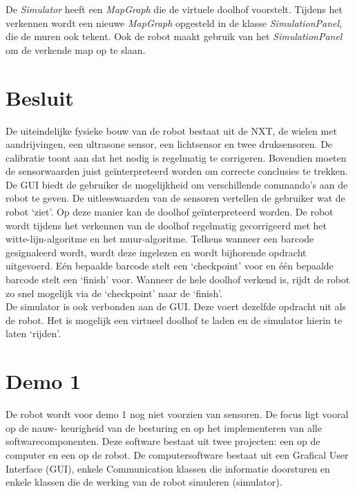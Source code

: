 \documentclass[eind]{penoverslag}
\begin{document}
De \textit{Simulator} heeft een \textit{MapGraph} die de virtuele doolhof voorstelt. Tijdens het verkennen wordt een nieuwe \textit{MapGraph} opgesteld in de klasse \textit{SimulationPanel}, die de muren ook tekent. Ook de robot maakt gebruik van het \textit{SimulationPanel} om de verkende map op te slaan.

\section{Besluit} %
\label{sec:besl}
De uiteindelijke fysieke bouw van de robot bestaat uit de NXT, de wielen met aandrijvingen, een ultrasone sensor, een lichtsensor en twee druksensoren. De calibratie toont aan dat het nodig is regelmatig te corrigeren. Bovendien moeten de sensorwaarden juist ge\"interpreteerd worden om correcte conclusies te trekken.\\

De GUI biedt de gebruiker de mogelijkheid om verschillende commando's aan de robot te geven. De uitleeswaarden van de sensoren vertellen de gebruiker wat de robot `ziet'. Op deze manier kan de doolhof ge\"interpreteerd worden. De robot wordt tijdens het verkennen van de doolhof regelmatig gecorrigeerd met het witte-lijn-algoritme en het muur-algoritme. Telkens wanneer een barcode gesignaleerd wordt, wordt deze ingelezen en wordt bijhorende opdracht uitgevoerd. E\'en bepaalde barcode stelt een `checkpoint' voor en \'e\'en bepaalde barcode stelt een `finish' voor. Wanneer de hele doolhof verkend is, rijdt de robot zo snel mogelijk via de `checkpoint' naar de `finish'.\\

De simulator is ook verbonden aan de GUI. Deze voert dezelfde opdracht uit als de robot. Het is mogelijk een virtueel doolhof te laden en de simulator hierin te laten `rijden'.


\newpage
\makeappendix

\section{Demo 1} %
\label{Asec:demo1}
De robot wordt voor demo 1 nog niet voorzien van sensoren. De focus ligt vooral op de nauw-
keurigheid van de besturing en op het implementeren van alle softwarecomponenten. Deze software
bestaat uit twee projecten: een op de computer en een op de robot. De computersoftware bestaat
uit een Grafical User Interface (GUI), enkele Communication klassen die informatie doorsturen en
enkele klassen die de werking van de robot simuleren (simulator).
\end{document}
